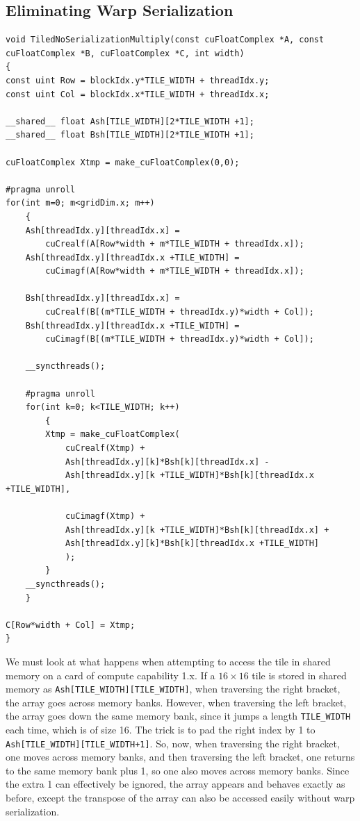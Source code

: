 \documentclass[a4paper,12pt]{report}
\begin{document}
\subsection{Eliminating Warp Serialization}
\begin{lstlisting}[float,caption=Tiled Matrix Multiplication Kernel Without Warp Serialization, label=lst:noSerialization_kernel]
void TiledNoSerializationMultiply(const cuFloatComplex *A, const cuFloatComplex *B, cuFloatComplex *C, int width)
{
const uint Row = blockIdx.y*TILE_WIDTH + threadIdx.y;
const uint Col = blockIdx.x*TILE_WIDTH + threadIdx.x;

__shared__ float Ash[TILE_WIDTH][2*TILE_WIDTH +1];
__shared__ float Bsh[TILE_WIDTH][2*TILE_WIDTH +1];

cuFloatComplex Xtmp = make_cuFloatComplex(0,0);

#pragma unroll
for(int m=0; m<gridDim.x; m++)
	{
	Ash[threadIdx.y][threadIdx.x] =
		cuCrealf(A[Row*width + m*TILE_WIDTH + threadIdx.x]);
	Ash[threadIdx.y][threadIdx.x +TILE_WIDTH] =
		cuCimagf(A[Row*width + m*TILE_WIDTH + threadIdx.x]);
	
	Bsh[threadIdx.y][threadIdx.x] =
		cuCrealf(B[(m*TILE_WIDTH + threadIdx.y)*width + Col]);
	Bsh[threadIdx.y][threadIdx.x +TILE_WIDTH] =
		cuCimagf(B[(m*TILE_WIDTH + threadIdx.y)*width + Col]);
	
	__syncthreads();

	#pragma unroll
	for(int k=0; k<TILE_WIDTH; k++)
		{
		Xtmp = make_cuFloatComplex(
			cuCrealf(Xtmp) +
			Ash[threadIdx.y][k]*Bsh[k][threadIdx.x] -
			Ash[threadIdx.y][k +TILE_WIDTH]*Bsh[k][threadIdx.x +TILE_WIDTH],
			
			cuCimagf(Xtmp) +
			Ash[threadIdx.y][k +TILE_WIDTH]*Bsh[k][threadIdx.x] +
			Ash[threadIdx.y][k]*Bsh[k][threadIdx.x +TILE_WIDTH]
			);
		}
	__syncthreads();
	}

C[Row*width + Col] = Xtmp;
}
\end{lstlisting}

We must look at what happens when attempting to access the tile in shared memory on a card of compute capability 1.x. If a $16 \times 16$ tile is stored in shared memory as \verb!Ash[TILE_WIDTH][TILE_WIDTH]!, when traversing the right bracket, the array goes across memory banks.
However, when traversing the left bracket, the array goes down the same memory bank, since it jumps a length \verb!TILE_WIDTH! each time, which is of size 16.
The trick is to pad the right index by 1 to \verb!Ash[TILE_WIDTH][TILE_WIDTH+1]!.
So, now, when traversing the right bracket, one moves across memory banks, and then traversing the left bracket, one returns to the same memory bank plus 1, so one also moves across memory banks.
Since the extra 1 can effectively be ignored, the array appears and behaves exactly as before, except the transpose of the array can also be accessed easily without warp serialization.
\end{document}
